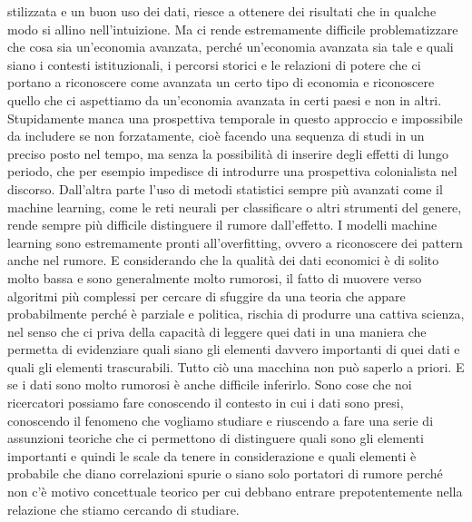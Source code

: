 \documentclass[a4paper, headings=standardclasses]{scrartcl}
\begin{document}
stilizzata e un buon uso dei dati, riesce a ottenere dei risultati che in qualche modo si allino nell'intuizione.
Ma ci rende estremamente difficile problematizzare che cosa sia un'economia avanzata, perché un'economia avanzata sia tale
e quali siano i contesti istituzionali, i percorsi storici e le relazioni di potere che ci portano a riconoscere come avanzata
un certo tipo di economia e riconoscere quello che ci aspettiamo da un'economia avanzata in certi paesi e non in altri.
Stupidamente manca una prospettiva temporale in questo approccio e impossibile da includere se non forzatamente,
cioè facendo una sequenza di studi in un preciso posto nel tempo, ma senza la possibilità di inserire degli effetti di lungo periodo,
che per esempio impedisce di introdurre una prospettiva colonialista nel discorso.
Dall'altra parte l'uso di metodi statistici sempre più avanzati come il machine learning, come le reti neurali per classificare
o altri strumenti del genere, rende sempre più difficile distinguere il rumore dall'effetto.
I modelli machine learning sono estremamente pronti all'overfitting, ovvero a riconoscere dei pattern anche nel rumore.
E considerando che la qualità dei dati economici è di solito molto bassa e sono generalmente molto rumorosi,
il fatto di muovere verso algoritmi più complessi per cercare di sfuggire da una teoria che appare probabilmente perché è parziale e politica,
rischia di produrre una cattiva scienza, nel senso che ci priva della capacità di leggere quei dati in una maniera che permetta di evidenziare
quali siano gli elementi davvero importanti di quei dati e quali gli elementi trascurabili. Tutto ciò una macchina non può saperlo a priori.
E se i dati sono molto rumorosi è anche difficile inferirlo. Sono cose che noi ricercatori possiamo fare conoscendo il contesto in cui i dati sono presi,
conoscendo il fenomeno che vogliamo studiare e riuscendo a fare una serie di assunzioni teoriche che ci permettono di distinguere
quali sono gli elementi importanti e quindi le scale da tenere in considerazione e quali elementi è probabile che diano correlazioni spurie
o siano solo portatori di rumore perché non c'è motivo concettuale teorico per cui debbano entrare prepotentemente nella relazione che stiamo cercando di studiare.
\end{document}
